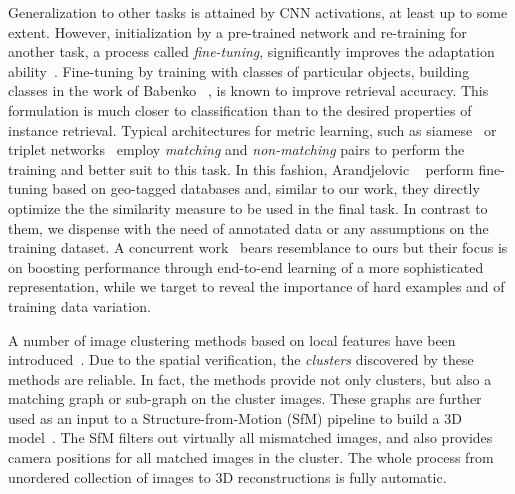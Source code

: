 Generalization to other tasks \cite{ARSM+14} is attained by CNN activations, at least up to some extent.
However, initialization by a pre-trained network and re-training for another task, a process called \emph{fine-tuning}, significantly improves the adaptation ability~\cite{ZDGD14,OBLS14}. 
Fine-tuning by training with classes of particular objects, \eg building classes in the work of Babenko \etal~\cite{BSCL14}, is known to improve retrieval accuracy. 
This formulation is much closer to classification than to the desired properties of instance retrieval. 
Typical architectures for metric learning, such as siamese~\cite{CHL05,HCL06,HLT14} or triplet networks~\cite{WSLT+14,SKP15,HA15} employ \emph{matching} and \emph{non-matching} pairs to perform the training and better suit to this task.
In this fashion, Arandjelovic \etal~\cite{AGTPS15} perform fine-tuning based on geo-tagged databases and, similar to our work, they directly optimize the the similarity measure to be used in the final task. 
In contrast to them, we dispense with the need of annotated data or any assumptions on the training dataset. 
A concurrent work~\cite{GARL16} bears resemblance to ours but their focus is on boosting performance through end-to-end learning of a more sophisticated representation, while we target to reveal the importance of hard examples and of training data variation. 

A number of image clustering methods based on local features have been introduced~\cite{CM10a,WL13,PSZ11}. 
Due to the spatial verification, the \emph{clusters} discovered by these methods are reliable. 
In fact, the methods provide not only clusters, but also a matching graph or sub-graph on the cluster images. 
%
These graphs are further used as an input to a Structure-from-Motion (SfM) pipeline to build a 3D model~\cite{SRCF15}. 
The SfM filters out virtually all mismatched images, and also provides camera positions for all matched images in the cluster. 
The whole process from unordered collection of images to 3D reconstructions is fully automatic.

